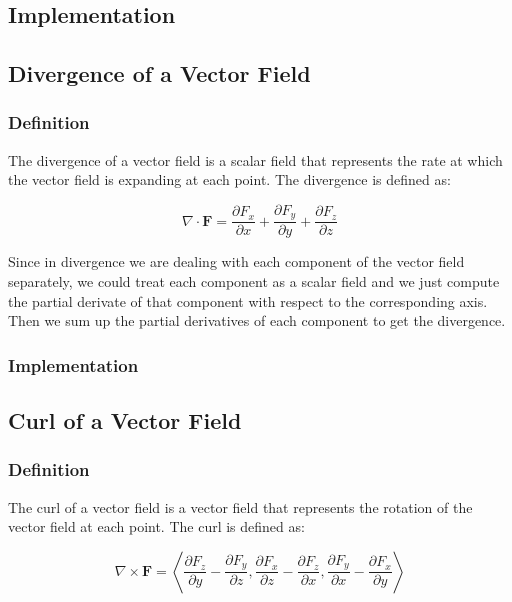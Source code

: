 \documentclass[12pt]{article}
\begin{document}
\subsection{Implementation}

\subsection{Divergence of a Vector Field}

\subsubsection{Definition}

The divergence of a vector field is a scalar field that represents the rate at which the vector field is expanding at each point. The divergence is defined as:

\[
    \nabla \cdot \mathbf{F} = \frac{\partial F_x}{\partial x} + \frac{\partial F_y}{\partial y} + \frac{\partial F_z}{\partial z}
\]

Since in divergence we are dealing with each component of the vector field separately, we could treat each component as a scalar field and we just compute the partial derivate of that component with respect to the corresponding axis.
Then we sum up the partial derivatives of each component to get the divergence.

\subsubsection{Implementation}

\subsection{Curl of a Vector Field}

\subsubsection{Definition}

The curl of a vector field is a vector field that represents the rotation of the vector field at each point. The curl is defined as:

\[
    \nabla \times \mathbf{F} = \left\langle \frac{\partial F_z}{\partial y} - \frac{\partial F_y}{\partial z}, \frac{\partial F_x}{\partial z} - \frac{\partial F_z}{\partial x}, \frac{\partial F_y}{\partial x} - \frac{\partial F_x}{\partial y}\right\rangle
\]
\end{document}

